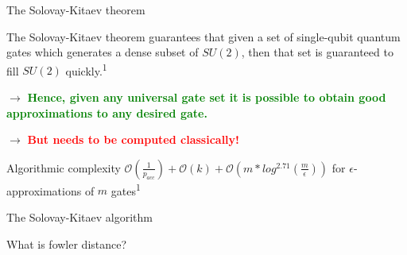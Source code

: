 \documentclass[10pt]{beamer}
\begin{document}
{
\begin{frame}{The Solovay-Kitaev theorem}

The Solovay-Kitaev theorem guarantees that given a set of single-qubit quantum gates which generates a dense subset of $SU(2)$, then that set is guaranteed to fill $SU(2)$ quickly.\textsuperscript{1}
 
$\rightarrow$ \textcolor{green}{\textbf{Hence, given any universal gate set it is possible to obtain good approximations to any desired gate.}}

$\rightarrow$ \textcolor{red}{\textbf{But needs to be computed classically!}}
\vspace{16mm}
	\begin{alertblock}{Algorithmic complexity}
	$\mathcal{O}(\frac{1}{p_{acc}})+\mathcal{O}(k)+\mathcal{O}(m*log^{2.71}(\frac{m}{\epsilon}))$ for $\epsilon$-approximations of $m$ gates\textsuperscript{1}
	\end{alertblock}
\end{frame}
}

{
\begin{frame}{The Solovay-Kitaev algorithm}

What is fowler distance?

\begin{figure}
  \end{figure}

\end{frame}
}
\end{document}
